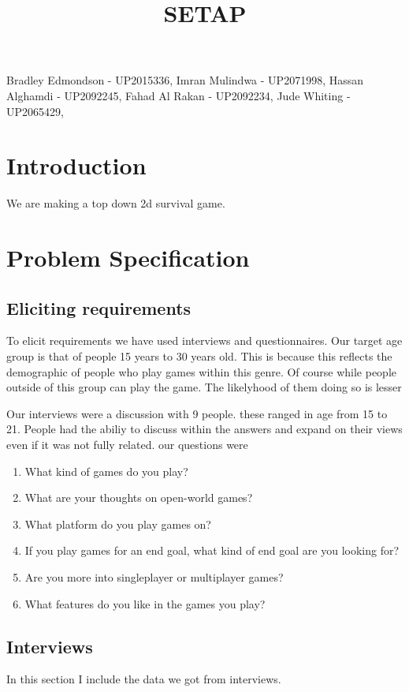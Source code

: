 \documentclass{article}
\title{SETAP}
\begin{document}
\maketitle
Bradley Edmondson - UP2015336,
Imran Mulindwa - UP2071998,
Hassan Alghamdi - UP2092245,
Fahad Al Rakan - UP2092234,
Jude Whiting - UP2065429,

\tableofcontents
\newpage
\section{Introduction}%
\label{sec:intro}
We are making a top down 2d survival game.

\section{Problem Specification}%
\label{sec:problem}
\subsection{Eliciting requirements}%
\label{subsec:reqs}
To elicit requirements we have used interviews and questionnaires. Our target age group is that of
people 15 years to 30 years old. This is because this reflects the demographic
of people who play games within this genre. Of course while people outside of
this group can play the game. The likelyhood of them doing so is lesser

Our interviews were a discussion with 9 people. these ranged in age from 15 to
21. People had the abiliy to discuss within the answers and expand on their
views even if it was not fully related.
our questions were
\begin{enumerate}
	\item What kind of games do you play?
	\item What are your thoughts on open-world games?
	\item What platform do you play games on?
	\item If you play games for an end goal, what kind of end goal are you looking for?
	\item Are you more into singleplayer or multiplayer games?
	\item What features do you like in the games you play?
\end{enumerate}
\subsection{Interviews}%
\label{subsec:interviews}
In this section I include the data we got from interviews.
\end{document}
